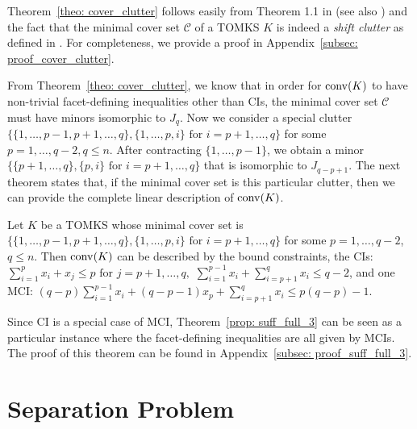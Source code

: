 Theorem~\ref{theo: cover_clutter} follows easily from Theorem 1.1 in \cite{laurent1992characterization} (see also \cite{seymour1977matroids}) and the fact that the minimal cover set $\mathcal C$ of a TOMKS $K$ is indeed a \emph{shift clutter} as defined in \cite{bertolazzi1987mn}. 
For completeness, we provide a proof in Appendix~\ref{subsec: proof_cover_clutter}. 


From Theorem~\ref{theo: cover_clutter}, we know that in order for $\operatorname{conv}(K)$ to have non-trivial facet-defining inequalities other than CIs, the minimal cover set $\mathcal C$ must have minors isomorphic to $J_q$. 
Now we consider a special clutter $\{\{1, \ldots, p-1, p+1, \ldots, q\}, \{1, \ldots, p, i\} \text{ for }i=p+1, \ldots, q\}$ for some $p = 1, \ldots, q-2, q \leq n$. 
After contracting $\{1, \ldots, p-1\}$, we obtain a minor $\{\{p+1, \ldots, q\}, \{p, i\} \text{ for } i = p+1, \ldots, q\}$ that is isomorphic to $J_{q-p+1}$. 
The next theorem states that, if the minimal cover set is this particular clutter, then we can provide the complete linear description of $\operatorname{conv}(K)$. 


\begin{theorem}
\label{prop: suff_full_3}
Let $K$ be a TOMKS whose minimal cover set is \\
$\{\{1, \ldots, p-1, p+1, \ldots, q\}, \{1, \ldots, p, i\} \text{ for }i=p+1, \ldots, q\}$ for some $p = 1, \ldots, q-2$, $q \leq n$. 
Then $\operatorname{conv}(K)$ can be described by the bound constraints, the CIs: $\sum_{i=1}^p x_i + x_j \leq p \text{ for } j=p+1, \ldots, q,$ $\sum_{i=1}^{p-1} x_i + \sum_{i=p+1}^q x_i \leq q-2$, and one MCI: $(q-p) \sum_{i=1}^{p-1} x_i + (q-p-1)x_p + \sum_{i=p+1}^q x_i \leq p(q-p)-1$.
\end{theorem}

Since CI is a special case of MCI, Theorem~\ref{prop: suff_full_3} can be seen as a particular instance where the facet-defining inequalities are all given by MCIs.
The proof of this theorem can be found in Appendix~\ref{subsec: proof_suff_full_3}. 


\section{Separation Problem}
\label{sec: separation}

